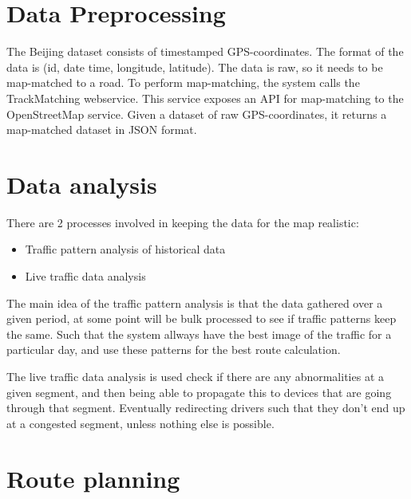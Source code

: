 \section{Data Preprocessing}
The Beijing dataset consists of timestamped GPS-coordinates. The format of the data is (id, date time, longitude, latitude). The data is raw, so it needs to be map-matched to a road. To perform map-matching, the system calls the TrackMatching webservice\cite{TrackMatching}. This service exposes an API for map-matching to the OpenStreetMap service. Given a dataset of raw GPS-coordinates, it returns a map-matched dataset in JSON format.

\section{Data analysis}
There are 2 processes involved in keeping the data for the map realistic:
\begin{itemize}
	\item Traffic pattern analysis of historical data
	\item Live traffic data analysis
\end{itemize}

The main idea of the traffic pattern analysis is that the data gathered over a given period, at some point will be bulk processed to see if traffic patterns keep the same. Such that the system allways have the best image of the traffic for a particular day, and use these patterns for the best route calculation.

The live traffic data analysis is used check if there are any abnormalities at a given segment, and then being able to propagate this to devices that are going through that segment. Eventually redirecting drivers such that they don't end up at a congested segment, unless nothing else is possible.
\section{Route planning}
